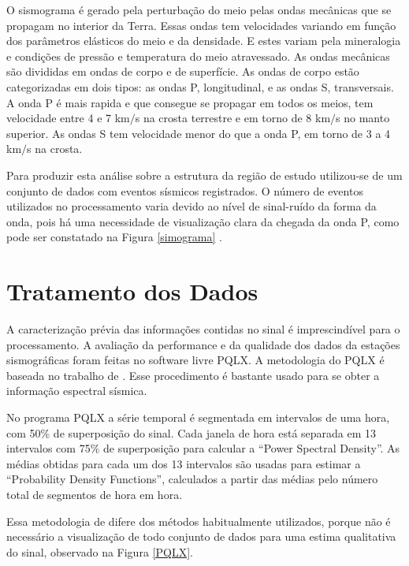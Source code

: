 O sismograma é gerado pela perturbação do meio pelas ondas  mecânicas que se propagam no interior da Terra. Essas ondas  tem velocidades variando em função dos parâmetros elásticos do meio e da densidade. E estes variam pela mineralogia e condições de pressão e temperatura do meio atravessado. As ondas mecânicas são divididas em ondas de corpo e de superfície. As ondas de corpo estão categorizadas em dois tipos: as ondas P, longitudinal, e as ondas S, transversais. A onda P é mais rapida e que consegue se propagar em todos os meios, tem velocidade entre 4 e 7 km$/$s na crosta terrestre e em torno de 8 km$/$s no manto superior. As ondas S tem velocidade menor do que a onda P, em torno de 3 a 4 km$/$s na crosta.

Para produzir esta análise sobre a estrutura da região de estudo utilizou-se de um conjunto de dados com eventos sísmicos registrados. O número de eventos utilizados no processamento varia devido ao nível de sinal-ruído da forma da onda, pois há uma necessidade de visualização clara da chegada da onda P, como pode ser constatado na Figura \ref{simograma} .

\section{Tratamento dos Dados}

A caracterização prévia das informações contidas no sinal é imprescindível para o processamento. A avaliação da performance e da qualidade dos dados da estações sismográficas foram feitas no software livre PQLX.  A metodologia do PQLX é baseada no trabalho de \cite{McNamara_Buland_2004}. Esse procedimento é bastante usado para se obter a informação espectral sísmica.

No programa PQLX a série temporal é segmentada em intervalos de uma hora, com 50\% de superposição do sinal. Cada janela de hora está separada em 13 intervalos com 75\% de superposição para calcular a “Power Spectral Density”. As médias obtidas para cada um dos 13 intervalos são usadas para estimar a “Probability Density Functions”, calculados a partir das médias pelo número total de segmentos de hora em hora. 

Essa metodologia de \cite{McNamara_Buland_2004} difere dos métodos habitualmente utilizados, porque não é necessário a visualização de todo conjunto de dados para uma estima qualitativa do sinal, observado na Figura \ref{PQLX}.


